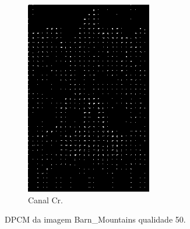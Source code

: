 \documentclass[a4paper, 12pt]{article}
\begin{document}
\begin{figure}[H]
\begin{subfigure}{0.3\textwidth}
                \centering
                \includegraphics[scale=0.5]{resources/DPCM/CR_DPCM50.png} 
                \caption{ Canal Cr.}
            \end{subfigure}
            \caption{\label{fig:my_label} DPCM da imagem Barn\_Mountains qualidade 50.}
        \end{figure}
\end{document}
